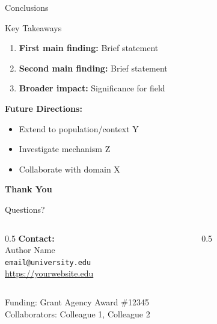 \documentclass[aspectratio=169,11pt]{beamer}
\begin{document}
\begin{frame}{Conclusions}
  \begin{block}{Key Takeaways}
    \begin{enumerate}
      \item \textbf{First main finding:} Brief statement
      \item \textbf{Second main finding:} Brief statement
      \item \textbf{Broader impact:} Significance for field
    \end{enumerate}
  \end{block}
  
  \vspace{0.5cm}
  
  \textbf{Future Directions:}
  \begin{itemize}
    \item Extend to population/context Y
    \item Investigate mechanism Z
    \item Collaborate with domain X
  \end{itemize}
\end{frame}

\begin{frame}[plain]
  \begin{center}
    {\Large \textbf{Thank You}}
    
    \vspace{1cm}
    
    {\large Questions?}
    
    \vspace{1cm}
    
    \begin{columns}
      \begin{column}{0.5\textwidth}
        \textbf{Contact:}\\
        Author Name\\
        \texttt{email@university.edu}\\
        \url{https://yourwebsite.edu}
      \end{column}
      
      \begin{column}{0.5\textwidth}
      \end{column}
    \end{columns}
    
    \vspace{0.5cm}
    
    {\footnotesize
      Funding: Grant Agency Award \#12345\\
      Collaborators: Colleague 1, Colleague 2
    }
  \end{center}
\end{frame}
\end{document}
